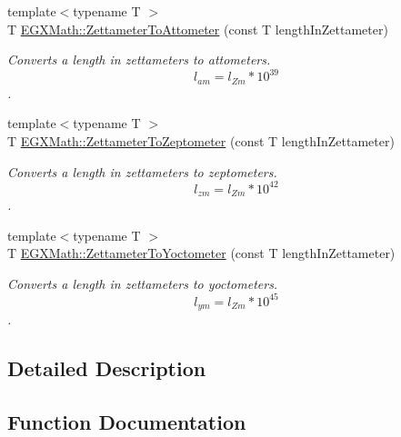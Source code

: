 \begin{DoxyCompactItemize}
{\footnotesize template$<$typename T $>$ }\\T \mbox{\hyperlink{group___e_g_x_math-_conversions-_length_conversions-_zettameter-_s_i_ga94b183c6ea2cd7e9df0edb3c9fd59a4a}{E\+G\+X\+Math\+::\+Zettameter\+To\+Attometer}} (const T length\+In\+Zettameter)
\begin{DoxyCompactList}\small\item\em Converts a length in zettameters to attometers. \[ l_{am}=l_{Zm} * 10^{39} \]. \end{DoxyCompactList}\item 
{\footnotesize template$<$typename T $>$ }\\T \mbox{\hyperlink{group___e_g_x_math-_conversions-_length_conversions-_zettameter-_s_i_gab9f9d7e92a7aaf47b4b822163cd700c7}{E\+G\+X\+Math\+::\+Zettameter\+To\+Zeptometer}} (const T length\+In\+Zettameter)
\begin{DoxyCompactList}\small\item\em Converts a length in zettameters to zeptometers. \[ l_{zm}=l_{Zm} * 10^{42} \]. \end{DoxyCompactList}\item 
{\footnotesize template$<$typename T $>$ }\\T \mbox{\hyperlink{group___e_g_x_math-_conversions-_length_conversions-_zettameter-_s_i_ga027661828604c5467325eb50e084d96d}{E\+G\+X\+Math\+::\+Zettameter\+To\+Yoctometer}} (const T length\+In\+Zettameter)
\begin{DoxyCompactList}\small\item\em Converts a length in zettameters to yoctometers. \[ l_{ym}=l_{Zm} * 10^{45} \]. \end{DoxyCompactList}\end{DoxyCompactItemize}


\subsection{Detailed Description}


\subsection{Function Documentation}
\mbox{\label{group___e_g_x_math-_conversions-_length_conversions-_zettameter-_s_i_ga94b183c6ea2cd7e9df0edb3c9fd59a4a}} 
